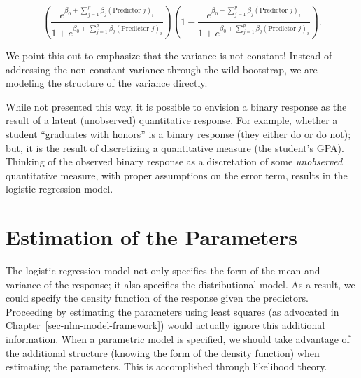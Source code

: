 \documentclass[
  letterpaper,
  DIV=11,
  numbers=noendperiod]{scrreprt}
\theoremstyle{definition}
\theoremstyle{definition}
\theoremstyle{remark}
\begin{document}
\[\left(\frac{e^{\beta_0 + \sum_{j=1}^{p} \beta_j (\text{Predictor } j)_i}}{1 + e^{\beta_0 + \sum_{j=1}^{p} \beta_j (\text{Predictor } j)_i}}\right)\left(1 - \frac{e^{\beta_0 + \sum_{j=1}^{p} \beta_j (\text{Predictor } j)_i}}{1 + e^{\beta_0 + \sum_{j=1}^{p} \beta_j (\text{Predictor } j)_i}}\right).\]

We point this out to emphasize that the variance is not constant!
Instead of addressing the non-constant variance through the wild
bootstrap, we are modeling the structure of the variance directly.

\begin{tcolorbox}[enhanced jigsaw, left=2mm, toprule=.15mm, arc=.35mm, breakable, opacitybacktitle=0.6, opacityback=0, rightrule=.15mm, colbacktitle=quarto-callout-note-color!10!white, coltitle=black, leftrule=.75mm, toptitle=1mm, colframe=quarto-callout-note-color-frame, titlerule=0mm, title=\textcolor{quarto-callout-note-color}{\faInfo}\hspace{0.5em}{Note}, bottomrule=.15mm, colback=white, bottomtitle=1mm]

While not presented this way, it is possible to envision a binary
response as the result of a latent (unobserved) quantitative response.
For example, whether a student ``graduates with honors'' is a binary
response (they either do or do not); but, it is the result of
discretizing a quantitative measure (the student's GPA). Thinking of the
observed binary response as a discretation of some \emph{unobserved}
quantitative measure, with proper assumptions on the error term, results
in the logistic regression model.

\end{tcolorbox}

\hypertarget{estimation-of-the-parameters}{%
\section{Estimation of the
Parameters}\label{estimation-of-the-parameters}}

The logistic regression model not only specifies the form of the mean
and variance of the response; it also specifies the distributional
model. As a result, we could specify the density function of the
response given the predictors. Proceeding by estimating the parameters
using least squares (as advocated in
Chapter~\ref{sec-nlm-model-framework}) would actually ignore this
additional information. When a parametric model is specified, we should
take advantage of the additional structure (knowing the form of the
density function) when estimating the parameters. This is accomplished
through likelihood theory.
\end{document}
